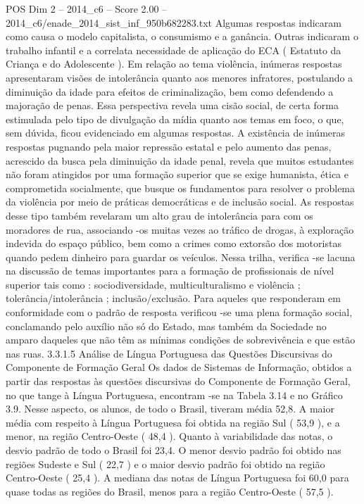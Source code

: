\begin{textsample}{POS Dim 2 – 2014\_c6 – Score 2.00 – 2014\_c6/enade\_2014\_sist\_inf\_950b682283.txt}
Algumas respostas indicaram como causa o modelo capitalista, o consumismo e a ganância.
Outras indicaram o trabalho infantil e a correlata necessidade de aplicação do ECA ( Estatuto da Criança e do Adolescente ).
Em relação ao tema violência, inúmeras respostas apresentaram visões de intolerância quanto aos menores infratores, postulando a diminuição da idade para efeitos de criminalização, bem como defendendo a majoração de penas.
Essa perspectiva revela uma cisão social, de certa forma estimulada pelo tipo de divulgação da mídia quanto aos temas em foco, o que, sem dúvida, ficou evidenciado em algumas respostas.
A existência de inúmeras respostas pugnando pela maior repressão estatal e pelo aumento das penas, acrescido da busca pela diminuição da idade penal, revela que muitos estudantes não foram atingidos por uma formação superior que se exige humanista, ética e comprometida socialmente, que busque os fundamentos para resolver o problema da violência por meio de práticas democráticas e de inclusão social.
As respostas desse tipo também revelaram um alto grau de intolerância para com os moradores de rua, associando -os muitas vezes ao tráfico de drogas, à exploração indevida do espaço público, bem como a crimes como extorsão dos motoristas quando pedem dinheiro para guardar os veículos.
Nessa trilha, verifica -se lacuna na discussão de temas importantes para a formação de profissionais de nível superior tais como : sociodiversidade, multiculturalismo e violência ; tolerância/intolerância ; inclusão/exclusão.
Para aqueles que responderam em conformidade com o padrão de resposta verificou -se uma plena formação social, conclamando pelo auxílio não só do Estado, mas também da Sociedade no amparo daqueles que não têm as mínimas condições de sobrevivência e que estão nas ruas. 3.3.1.5 Análise de Língua Portuguesa das Questões Discursivas do Componente de Formação Geral Os dados de Sistemas de Informação, obtidos a partir das respostas às questões discursivas do Componente de Formação Geral, no que tange à Língua Portuguesa, encontram -se na Tabela 3.14 e no Gráfico 3.9.
Nesse aspecto, os alunos, de todo o Brasil, tiveram média 52,8.
A maior média com respeito à Língua Portuguesa foi obtida na região Sul ( 53,9 ), e a menor, na região Centro-Oeste ( 48,4 ).
Quanto à variabilidade das notas, o desvio padrão de todo o Brasil foi 23,4.
O menor desvio padrão foi obtido nas regiões Sudeste e Sul ( 22,7 ) e o maior desvio padrão foi obtido na região Centro-Oeste ( 25,4 ).
A mediana das notas de Língua Portuguesa foi 60,0 para quase todas as regiões do Brasil, menos para a região Centro-Oeste ( 57,5 ).

\end{textsample}
